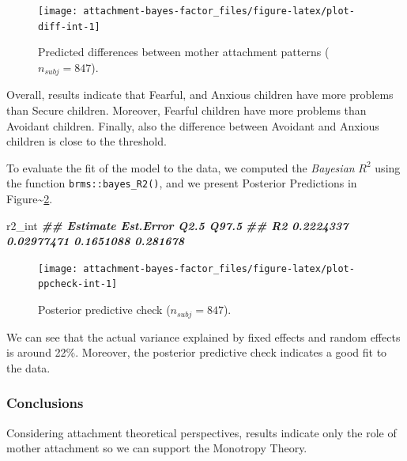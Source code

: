 \documentclass[
]{book}
\newenvironment{Shaded}{\begin{snugshade}}{\end{snugshade}}
\newcommand{\DocumentationTok}[1]{\textcolor[rgb]{0.56,0.35,0.01}{\textbf{\textit{#1}}}}
\newcommand{\NormalTok}[1]{#1}
\begin{document}
\begin{figure}

{\centering \texttt{[image: attachment-bayes-factor\_files/figure-latex/plot-diff-int-1]} 

}

\caption{Predicted differences between mother attachment patterns ($n_{subj} = 847$).}\label{fig:plot-diff-int}
\end{figure}

Overall, results indicate that Fearful, and Anxious children have more problems than Secure children. Moreover, Fearful children have more problems than Avoidant children. Finally, also the difference between Avoidant and Anxious children is close to the threshold.

To evaluate the fit of the model to the data, we computed the \emph{Bayesian} \(R^2\) using the function \texttt{brms::bayes\_R2()}, and we present Posterior Predictions in Figure\textasciitilde\ref{fig:plot-ppcheck-int}.

\begin{Shaded}
\begin{Highlighting}[]
\NormalTok{r2\_int}
\DocumentationTok{\#\#     Estimate  Est.Error      Q2.5    Q97.5}
\DocumentationTok{\#\# R2 0.2224337 0.02977471 0.1651088 0.281678}
\end{Highlighting}
\end{Shaded}

\begin{figure}

{\centering \texttt{[image: attachment-bayes-factor\_files/figure-latex/plot-ppcheck-int-1]} 

}

\caption{Posterior predictive check ($n_{subj} = 847$).}\label{fig:plot-ppcheck-int}
\end{figure}

We can see that the actual variance explained by fixed effects and random effects is around 22\%. Moreover, the posterior predictive check indicates a good fit to the data.

\hypertarget{conclusions-5}{%
\subsubsection*{Conclusions}\label{conclusions-5}}

Considering attachment theoretical perspectives, results indicate only the role of mother attachment so we can support the Monotropy Theory.
\end{document}
